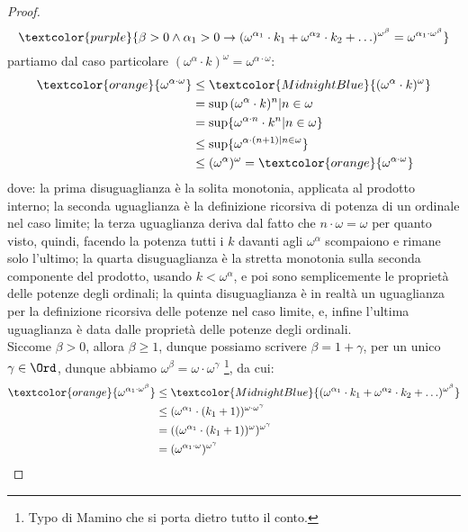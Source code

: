 \documentclass[11pt]{scrartcl}
\begin{document}
\begin{proof}
	\[ \textcolor{purple}{\beta > 0 \land \alpha_1 > 0 \rightarrow (\omega^{\alpha_1} \cdot k_1 + \omega^{\alpha_2} \cdot k_2 + \ldots)^{\omega^\beta} = \omega^{\alpha_1 \cdot \omega^{\beta}}}
		\]
	partiamo dal caso particolare $(\omega^{\alpha} \cdot k)^{\omega} = \omega^{\alpha \cdot \omega}$:
	\[ \begin{split}
		\textcolor{orange}{\omega^{\alpha \cdot \omega}} &\leq \textcolor{MidnightBlue}{(\omega^{\alpha} \cdot k)^{\omega}} \\
														 &= \sup{(\omega^\alpha \cdot k)^n | n \in \omega} \\
														 &= \sup\{\omega^{\alpha \cdot n}\cdot k^n | n \in \omega\} \\
														 &\leq \sup\{\omega^{\alpha \cdot (n + 1) | n \in \omega}\} \\
														 &\leq (\omega^{\alpha})^\omega = \textcolor{orange}{\omega^{\alpha \cdot \omega}}
	\end{split}
		\]
	dove: la prima disuguaglianza è la solita monotonia, applicata al prodotto interno; la seconda uguaglianza è la definizione ricorsiva di potenza di un ordinale nel caso limite;
	la terza uguaglianza deriva dal fatto che $n \cdot \omega = \omega$ per quanto visto, quindi, facendo la potenza tutti i $k$ davanti agli $\omega^\alpha$ scompaiono e rimane solo l'ultimo;
	la quarta disuguaglianza è la stretta monotonia sulla seconda componente del prodotto, usando $k < \omega^\alpha$, e poi sono semplicemente le proprietà delle potenze degli ordinali;
	la quinta disuguaglianza è in realtà un uguaglianza per la definizione ricorsiva delle potenze nel caso limite, e, infine l'ultima uguaglianza è data dalle proprietà delle potenze degli ordinali.\\
	Siccome $\beta > 0$, allora $\beta \geq 1$, dunque possiamo scrivere $\beta = 1 + \gamma$, per un unico $\gamma \in \Ord$, dunque abbiamo $\omega^\beta = \omega \cdot \omega^\gamma$ \footnote{Typo di Mamino che si porta dietro tutto il conto.}, da cui:
	\[ \begin{split}
		\textcolor{orange}{\omega^{\alpha_1 \cdot \omega^\beta}} &\leq \textcolor{MidnightBlue}{(\omega^{\alpha_1} \cdot k_1 + \omega^{\alpha_2} \cdot k_2 + \ldots)^{\omega^\beta}} \\
															   &\leq (\omega^{\alpha_1} \cdot (k_1 + 1))^{\omega\cdot \omega^{\gamma}} \\
															   &= ((\omega^{\alpha_1} \cdot (k_1 + 1))^{\omega})^{\omega^{\gamma}} \\
															   &= (\omega^{\alpha_1 \cdot \omega})^{\omega^\gamma} \\

\end{split}\]
\end{proof}
\end{document}
